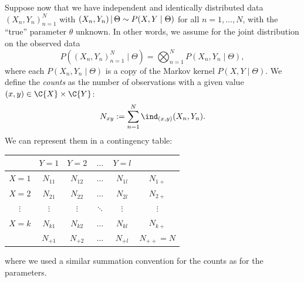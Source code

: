 Suppose now that we have independent and identically distributed data $(X_n,Y_n)_{n=1}^N$ with
$(X_n,Y_n) \operatorname*{|} \Theta \sim P(X,Y \mid \Theta)$ for all $n=1,\dots,N$, with the ``true'' parameter $\theta$
unknown.
In other words, we assume for the joint distribution on the observed data
$$P((X_n,Y_n)_{n=1}^N \mid \Theta) = \bigotimes_{n=1}^N P(X_n,Y_n \mid \Theta),$$
where each $P(X_n,Y_n \mid \Theta)$ is a copy of the Markov kernel $P(X,Y \mid \Theta)$.
We define the \emph{counts} as the number of observations with a given value $(x,y)\in\C{X}\times\C{Y}$:
$$N_{xy} := \sum_{n=1}^N \ind_{(x,y)}(X_n,Y_n).$$
We can represent them in a contingency table:
\begin{center}\begin{tabular}{c|cccc|c}
  & $Y=1$         & $Y=2$ & $\dots$ & $Y=l$ \\
  \hline
  $X=1$ & $N_{11}$      & $N_{12}$      & $\dots$ & $N_{1l}$ & $N_{1+}$\\
  $X=2$ & $N_{21}$      & $N_{22}$      & $\dots$ & $N_{2l}$ & $N_{2+}$\\
  $\vdots$ & $\vdots$     & $\vdots$       & $\ddots$ & $\vdots$  & $\vdots$ \\
  $X=k$ & $N_{k1}$      & $N_{k2}$      & $\dots$ & $N_{kl}$ & $N_{k+}$ \\
  \hline
  & $N_{+ 1}$ & $N_{+ 2}$ & $\dots$ & $N_{+ l}$ & $N_{++} = N$\\
\end{tabular}\end{center}
where we used a similar summation convention for the counts as for the parameters.

